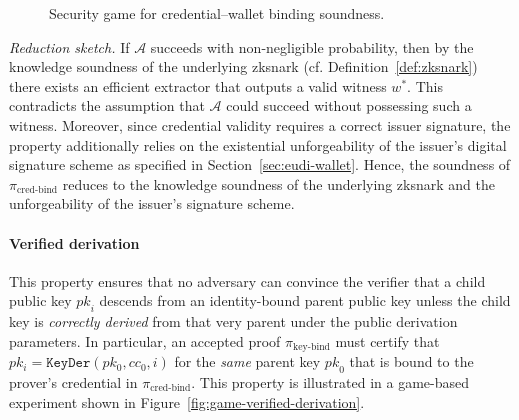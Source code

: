 \begin{figure}[t]
	\centering
	\begin{gameproof}[name=\mathsf{Exp}^{\mathsf{CWS}}, arg=(1^{\lambda}), nr=0]
		\makeatletter
		\renewcommand\@pc@gametitle[1][]{\ensuremath{\pcgame[\mathcal{A}]\gameprocedurearg}}
		\makeatother
	\end{gameproof}
	\caption{Security game for credential–wallet binding soundness.}
	\label{fig:game-cred-bind-sound}
\end{figure}

\medskip
\textit{Reduction sketch.}
If $\mathcal{A}$ succeeds with non-negligible probability, then by the knowledge soundness of the underlying \acrshort{zksnark} (cf. Definition~\ref{def:zksnark}) there exists an efficient extractor that outputs a valid witness $w^*$. This contradicts the assumption that $\mathcal{A}$ could succeed without possessing such a witness. Moreover, since credential validity requires a correct issuer signature, the property additionally relies on the existential unforgeability of the issuer's digital signature scheme as specified in Section~\ref{sec:eudi-wallet}. Hence, the soundness of $\pi_{\text{cred-bind}}$ reduces to the knowledge soundness of the underlying \acrshort{zksnark} and the unforgeability of the issuer's signature scheme.

\paragraph{Verified derivation}
This property ensures that no adversary can convince the verifier that a child public key $\mathit{pk}_i$ descends from an identity-bound parent public key unless the child key is \emph{correctly derived} from that very parent under the public derivation parameters. In particular, an accepted proof $\pi_{\text{key-bind}}$ must certify that $pk_i = \texttt{KeyDer}(pk_0, cc_0, i)$ for the \emph{same} parent key $\mathit{pk}_0$ that is bound to the prover's credential in $\pi_{\text{cred-bind}}$. This property is illustrated in a game-based experiment shown in Figure~\ref{fig:game-verified-derivation}.

